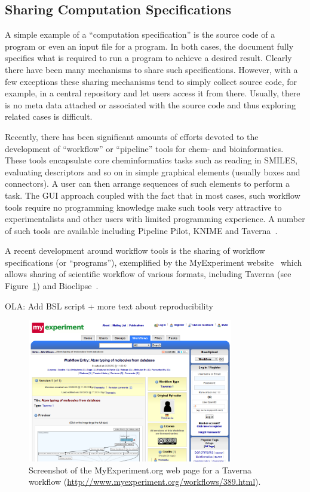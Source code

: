 \documentclass[11pt]{book}
\newcommand{\ola}[1]{{\color{green} OLA: #1}}
\begin{document}
\subsection{Sharing Computation Specifications}

A simple example of a ``computation specification'' is the source code
of a program or even an input file for a program. In both cases, the
document fully specifies what is required to run a program to achieve
a desired result. Clearly there have been many mechanisms to share
such specifications. However, with a few exceptions these sharing
mechanisms tend to simply collect source code, for example, in a
central repository and let users access it from there. Usually, there
is no meta data attached or associated with the source code and thus
exploring related cases is difficult.

Recently, there has been significant amounts of efforts devoted to the
development of ``workflow'' or ``pipeline'' tools for chem- and
bioinformatics. These tools encapsulate core cheminformatics tasks
such as reading in SMILES, evaluating descriptors and so on in simple
graphical elements (usually boxes and connectors). A user can then
arrange sequences of such elements to perform a task. The GUI approach
coupled with the fact that in most cases, such workflow tools require
no programming knowledge make such tools very attractive to
experimentalists and other users with limited programming
experience. A number of such tools are available including Pipeline
Pilot, KNIME and Taverna~\cite{Oinn2004}.

A recent development around workflow tools is the sharing of workflow
specifications (or ``programs''), exemplified by the MyExperiment
website~\cite{Goble2010} which allows sharing of scientific workflow
of various formats, including Taverna (see Figure~\ref{fig:myexperiment})
and Bioclipse~\cite{Spjuth2009,Spjuth2007}.

\ola{Add BSL script + more text about reproducibility}

\begin{figure}[bt]
\begin{center}
\includegraphics[width=0.8\textwidth]{graphics/myexperiment.png}
\end{center}
\caption{Screenshot of the MyExperiment.org web page for a
Taverna workflow (\url{http://www.myexperiment.org/workflows/389.html}).}
\label{fig:myexperiment}
\end{figure}
\end{document}

